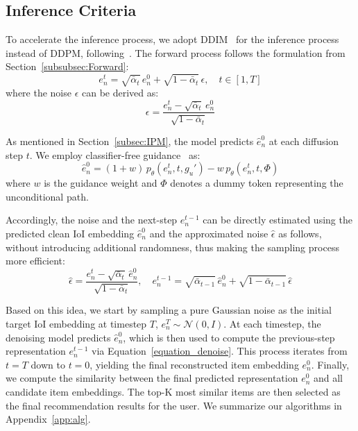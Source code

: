 \documentclass[sigconf,nonacm]{acmart}
\begin{document}
\subsection{Inference Criteria}
To accelerate the inference process, we adopt DDIM~\cite{song2020denoising} for the inference process instead of DDPM, following~\cite{liu2024preference}. The forward process follows the formulation from Section~\ref{subsubsec:Forward}:
\begin{equation}
{e}_n^{t} = \sqrt{\bar{\alpha}_t} \, {e}_n^{0} + \sqrt{1 - \bar{\alpha}_t} \, {\epsilon}, \quad t \in [1, T]
\end{equation}
where the noise \( {\epsilon} \) can be derived as:
\begin{equation}
{\epsilon} = \frac{{e}_n^{t} - \sqrt{\bar{\alpha}_t} \, {e}_n^{0}}{\sqrt{1 - \bar{\alpha}_t}}
\end{equation}

As mentioned in Section~\ref{subsec:IPM}, the model predicts \( \hat e_n^0 \) at each diffusion step \( t \). 
We employ classifier-free guidance~\cite{ho2022classifier} as:
\begin{equation}
\hat e_n^0 = (1 + w) \, p_\theta(e_n^t, t, g_u') - w \, p_\theta(e_n^t, t, \Phi)
\end{equation}
where \( w \) is the guidance weight and \( \Phi \) denotes a dummy token representing the unconditional path.

Accordingly, the noise and the next-step \( {e}_n^{t-1} \) can be directly estimated using the predicted clean IoI embedding \( \hat{{e}}_n^{0} \) and the approximated noise \( \hat{{\epsilon}} \) as follows, without introducing additional randomness, thus making the sampling process more efficient:
\begin{equation}
\label{equation_denoise}
\hat{{\epsilon}} = \frac{{e}_n^{t} - \sqrt{\bar{\alpha}_t} \, \hat{{e}}_n^{0}}{\sqrt{1 - \bar{\alpha}_t}}, \quad
{e}_n^{t-1} = \sqrt{\bar{\alpha}_{t-1}} \, \hat{{e}}_n^{0} + \sqrt{1 - \bar{\alpha}_{t-1}} \, \hat{{\epsilon}}
\end{equation}

Based on this idea, we start by sampling a pure Gaussian noise as the initial target IoI embedding at timestep \( T \), \( {e}_n^{T} \sim \mathcal{N}(0, {I}) \). At each timestep, the denoising model predicts \( \hat{{e}}_n^{0} \), which is then used to compute the previous-step representation \( {e}_n^{t-1} \) via Equation~\ref{equation_denoise}. This process iterates from \( t = T \) down to \( t = 0 \), yielding the final reconstructed item embedding \( {e}_n^{0} \). Finally, we compute the similarity between the final predicted representation \( {e}_n^{0} \) and all candidate item embeddings. The top-K most similar items are then selected as the final recommendation results for the user. We summarize our algorithms in Appendix~\ref{app:alg}.
\end{document}
